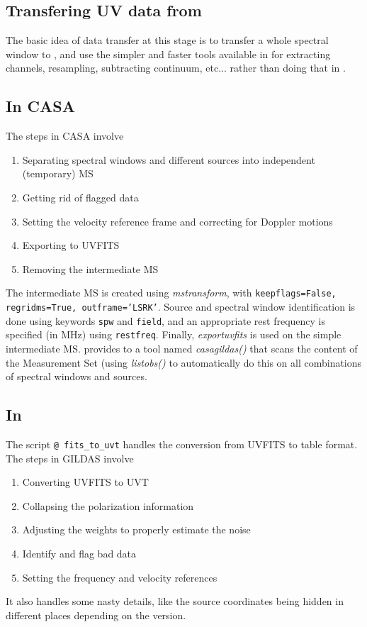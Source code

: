 \subsection{Transfering UV data from \casa{}}

The basic idea of data transfer at this stage is to transfer
a whole spectral window to \gildas{}, and use the simpler and faster
tools available in \imager{} for extracting channels, resampling,
subtracting continuum, etc... rather than doing that in \casa{}.

\subsection{In CASA}
The steps in CASA involve
\begin{enumerate}
\item Separating spectral windows and different sources into 
independent (temporary) MS
\item Getting rid of flagged data 
\item Setting the velocity reference frame and correcting
for Doppler motions
\item Exporting to UVFITS 
\item Removing the intermediate MS
\end{enumerate}
The intermediate MS is created using \textit{mstransform},  with 
\texttt{keepflags=False, regridms=True, outframe='LSRK'}. Source and 
spectral window identification is done using keywords \texttt{spw} and 
\texttt{field}, and an appropriate rest frequency is specified (in MHz) 
using \texttt{restfreq}. Finally, \textit{exportuvfits}  is used on the 
simple intermediate MS. \imager{} provides to \casa{} a tool named
\textit{casagildas()} that scans the content of the Measurement Set
(using \textit{listobs()} to automatically do this on all combinations
of spectral windows and sources.

\subsection{In \imager{} }

The script \texttt{@ fits\_to\_uvt} handles the conversion from
UVFITS to \uv{} table format.
The steps in GILDAS involve
\begin{enumerate}
\item Converting UVFITS to UVT
\item Collapsing the polarization information
\item Adjusting the weights to properly estimate the noise
\item Identify and flag bad data
\item Setting the frequency and velocity references
\end{enumerate}
It also handles some nasty details, like the source coordinates
being hidden in different places depending on the \casa{} version.

